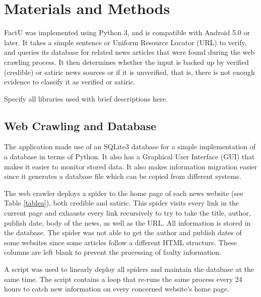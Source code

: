 \documentclass[journal]{./IEEEtran}
\begin{document}
	\section{Materials and Methods}
	
	FactU was implemented using Python 3, and is compatible with Android 5.0 or later. It takes a simple sentence or Uniform Resource Locator (URL) to verify, and queries its database for related news articles that were found during the web crawling process. It then determines whether the input is backed up by verified (credible) or satiric news sources or if it is unverified, that is, there is not enough evidence to classify it as verified or satiric.
	
	Specify all libraries used with brief descriptions here.
	
	\subsection{Web Crawling and Database}
	The application made use of an SQLite3 database for a simple implementation of a database in terms of Python. It also has a Graphical User Interface (GUI) that makes it easier to monitor stored data. It also makes information migration easier since it generates a database file which can be copied from different systems.
	
	The web crawler deploys a spider to the home page of each news website (see Table \ref{tablea}), both credible and satiric. This spider visits every link in the current page and exhausts every link recursively to try to take the title, author, publish date, body of the news, as well as the URL. All information is  stored in the database. The spider was not able to get the author and publish dates of some websites since some articles follow a different HTML structure. These columns are left blank to prevent the processing of faulty information.
	
	A script was used to linearly deploy all spiders and maintain the database at the same time. The script contains a loop that re-runs the same process every 24 hours to catch new information on every concerned website's home page.
	
\end{document}
